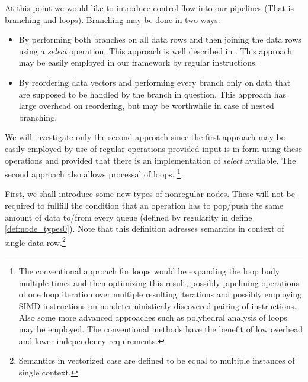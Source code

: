 At this point we would like to introduce control flow into our pipelines (That is branching and loops). Branching may be done in two ways:

\label{sec:branching}
\begin{itemize}
  \item By performing both branches on all data rows and then joining the data rows using a \emph{select} operation. This approach is well described in \cite{secondpaper}. This approach may be easily employed in our framework by regular instructions. 
  \item By reordering data vectors and performing every branch only on data that are supposed to be handled by the branch in question. This approach has large overhead on reordering, but may be worthwhile in case of nested branching.
\end{itemize}

We will investigate only the second approach since the first approach may be easily employed by use of regular operations provided input is in form using these operations and provided that there is an implementation of \emph{select} available. The second approach also allows processal of loops. \footnote{The conventional approach for loops would be expanding the loop body multiple times and then optimizing this result, possibly pipelining operations of one loop iteration over multiple resulting iterations and possibly employing SIMD instructions on nondeterministicaly discovered pairing of instructions\cite{compilers}. Also some more advanced approaches such as polyhedral analysis of loops may be employed\cite{polyhedral}. The conventional methods have the benefit of low overhead and lower independency requirements. }

\label{sec:node_types}

First, we shall introduce some new types of nonregular nodes. These will not be required to fullfill the condition that an operation has to pop/push the same amount of data to/from every queue (defined by regularity in define \ref{def:node_types0}). Note that this definition adresses semantics in context of single data row.\footnote{Semantics in vectorized case are defined to be equal to multiple instances of single context.}

